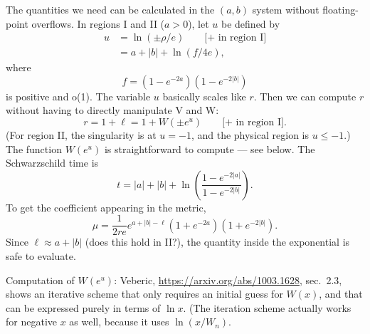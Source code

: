 \documentclass{article}
\begin{document}
The quantities we need can be calculated in the $(a,b)$ system without floating-point overflows.
In regions I and II ($a>0$), let $u$ be defined by
\begin{align*}
  u &= \ln(\pm \rho/e) \qquad \text{[+ in region I]} \\
    &= a+|b|+\ln(f/4e),
\end{align*}
where
\begin{equation*}
  f = (1-e^{-2a})(1-e^{-2|b|})
\end{equation*}
is positive and o(1). The variable $u$ basically scales like $r$.
Then we can compute $r$ without having to directly manipulate V and W:
\begin{equation*}
  r = 1+\ell=1+W(\pm e^u) \qquad \text{[+ in region I]}.
\end{equation*}
(For region II, the singularity is at $u=-1$, and the physical region is $u\le -1$.)
The function $W(e^u)$ is straightforward to compute --- see below.
The Schwarzschild time is
\begin{equation*}
  t = |a|+|b|+\ln\left(\frac{1-e^{-2|a|}}{1-e^{-2|b|}}\right).
\end{equation*}
To get the coefficient appearing in the metric,
\begin{equation*}
  \mu = \frac{1}{2re} e^{a+|b|-\ell}(1+e^{-2a})(1+e^{-2|b|}).
\end{equation*}
Since $\ell\approx a+|b|$ (does this hold in II?), the quantity inside the exponential is safe to evaluate.

Computation of $W(e^u)$:
Veberic, \url{https://arxiv.org/abs/1003.1628}, sec.~2.3, shows an iterative
scheme that only requires an initial guess for $W(x)$, and that can be expressed purely
in terms of $\ln x$. (The iteration scheme actually works for negative $x$ as well, because
it uses $\ln(x/W_n)$.
\end{document}
